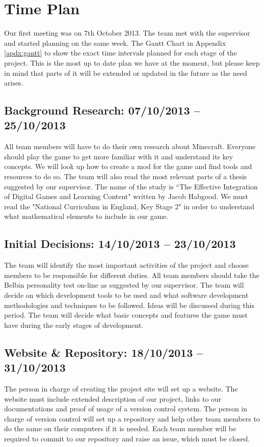 \chapter{Time Plan}
Our first meeting was on 7th October 2013. The team met with the supervisor and started 
planning on the same week. The Gantt Chart in Appendix \ref{apdx:gantt} to show the 
exact time intervals planned for each stage of the project. This is the most up to date
plan we have at the moment, but please keep in mind that parts of it will be extended 
or updated in the future as the need arises.

\section{Background Research: 07/10/2013 -- 25/10/2013}
All team members will have to do their own research about Minecraft. Everyone should play the game to get more familiar with it and understand its key concepts. We will look up how to create a mod for the game and find tools and resources to do so.
The team will also read the most relevant parts of a thesis suggested by our supervisor. The name of the study is “The Effective Integration of Digital Games and Learning Content" written by Jacob Habgood. 
We must read the "National Curriculum in England, Key Stage 2" in order to understand what mathematical elements to include in our game.

\section{Initial Decisions: 14/10/2013 -- 23/10/2013} 
The team will identify the most important activities of the project and choose members to be responsible for different duties. All team members should take the Belbin personality test on-line as suggested by our supervisor. The team will decide on which development tools to be used and what software development methodologies and techniques to be followed. Ideas will be discussed during this period. The team will decide what basic concepts and features the game must have during the early stages of development.

\section{Website \& Repository: 18/10/2013 -- 31/10/2013}
The person in charge of creating the project site will set up a website. The website must include extended description of our project, links to our documentations and proof of usage of a version control system.
The person in charge of version control will set up a repository and help other team members to do the same on their computers if it is needed. Each team member will be required to commit to our repository and raise an issue, which must be closed.

